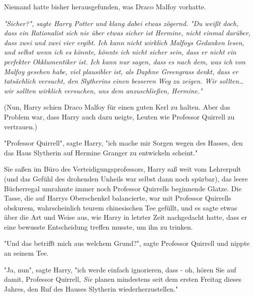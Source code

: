 {Niemand hatte bisher herausgefunden, was Draco Malfoy vorhatte.

\emph{"Sicher?", sagte Harry Potter und klang dabei etwas zögernd. "Du weißt doch, dass ein Rationalist sich nie über etwas sicher ist Hermine, nicht einmal darüber, dass zwei und zwei vier ergibt. Ich kann nicht wirklich Malfoys Gedanken lesen, und selbst wenn ich es könnte, könnte ich nicht sicher sein, dass er nicht ein perfekter Okklumentiker ist. Ich kann nur sagen, dass es nach dem, was ich von Malfoy gesehen habe, viel plausibler ist, als Daphne Greengrass denkt, dass er tatsächlich versucht, den Slytherins einen besseren Weg zu zeigen. Wir sollten… wir sollten wirklich versuchen, uns dem anzuschließen, Hermine."}

(Nun, Harry schien Draco Malfoy für einen guten Kerl zu halten. Aber das Problem war, dass Harry auch dazu neigte, Leuten wie Professor Quirrell zu vertrauen.)

"Professor Quirrell", sagte Harry, "ich mache mir Sorgen wegen des Hasses, den das Haus Slytherin auf Hermine Granger zu entwickeln scheint."

Sie saßen im Büro des Verteidigungsprofessors, Harry saß weit vom Lehrerpult (und das Gefühl des drohenden Unheils war selbst dann noch spürbar), das leere Bücherregal umrahmte immer noch Professor Quirrells beginnende Glatze. Die Tasse, die auf Harrys Oberschenkel balancierte, war mit Professor Quirrells obskurem, wahrscheinlich teurem chinesischen Tee gefüllt, und es sagte etwas über die Art und Weise aus, wie Harry in letzter Zeit nachgedacht hatte, dass er eine bewusste Entscheidung treffen musste, um ihn zu trinken.

"Und das betrifft mich aus welchem Grund?", sagte Professor Quirrell und nippte an seinem Tee.

"Ja, nun", sagte Harry, "ich werde einfach ignorieren, dass - oh, hören Sie auf damit, Professor Quirrell, \emph{Sie} planen mindestens seit dem ersten Freitag dieses Jahres, den Ruf des Hauses Slytherin wiederherzustellen."

}
